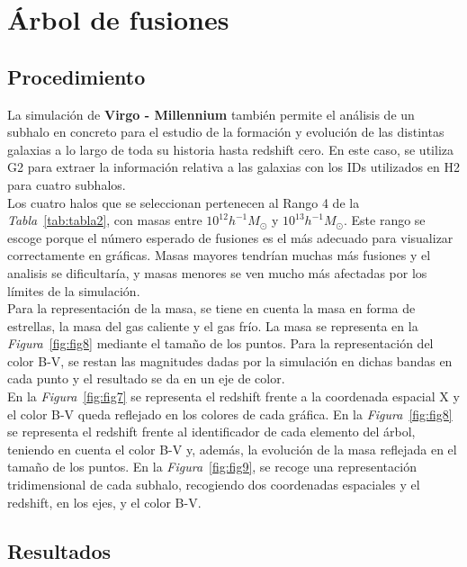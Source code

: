\section{Árbol de fusiones} 
\label{sec:3} %

\subsection{Procedimiento}
\label{subsec:3_A}

La simulación de \textbf{Virgo - Millennium}\cite{6} también permite el análisis de un subhalo en concreto para el estudio de la formación y evolución de las distintas galaxias a lo largo de toda su historia hasta redshift cero. En este caso, se utiliza G2 para extraer la información relativa a las galaxias con los IDs utilizados en H2 para cuatro subhalos. \\

Los cuatro halos que se seleccionan pertenecen al Rango 4 de la \textit{Tabla}~\ref{tab:tabla2}, con masas entre $10^{12}h^{-1}M_{\odot}$ y $10^{13}h^{-1}M_{\odot}$. Este rango se escoge porque el número esperado de fusiones es el más adecuado para visualizar correctamente en gráficas. Masas mayores tendrían muchas más fusiones y el analisis se dificultaría, y masas menores se ven mucho más afectadas por los límites de la simulación.\\

Para la representación de la masa, se tiene en cuenta la masa en forma de estrellas, la masa del gas caliente y el gas frío. La masa se representa en la \textit{Figura}~\ref{fig:fig8} mediante el tamaño de los puntos. Para la representación del color B-V, se restan las magnitudes dadas por la simulación en dichas bandas en cada punto y el resultado se da en un eje de color. \\

En la \textit{Figura}~\ref{fig:fig7} se representa el redshift frente a la coordenada espacial X y el color B-V queda reflejado en los colores de cada gráfica. En la \textit{Figura}~\ref{fig:fig8} se representa el redshift frente al identificador de cada elemento del árbol, teniendo en cuenta el color B-V y, además, la evolución de la masa reflejada en el tamaño de los puntos. En la \textit{Figura}~\ref{fig:fig9}, se recoge una representación tridimensional de cada subhalo, recogiendo dos coordenadas espaciales y el redshift, en los ejes, y el color B-V. \\

\subsection{Resultados}
\label{subsec:3_B}

